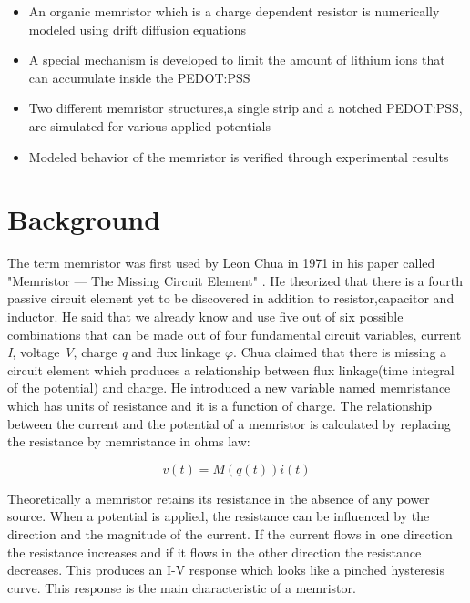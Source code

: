 \begin{doublespace}
\begin{itemize}
  \item An organic memristor which is a charge dependent resistor is numerically modeled using drift diffusion equations  
  \item A special mechanism is developed to limit the amount of lithium ions that can accumulate inside the PEDOT:PSS
  \item Two different memristor structures,a single strip and a notched PEDOT:PSS, are simulated for various applied potentials
  \item Modeled behavior of the memristor is verified through experimental results 
\end{itemize}

\section{Background}
The term memristor was first used by Leon Chua in 1971 in his paper called  "Memristor — The Missing Circuit Element" \cite{chua}. He theorized that there is a fourth passive circuit element yet to be discovered in addition to resistor,capacitor and inductor. He said that we already know and use five out of six possible combinations that can be made out of four fundamental circuit variables, current \textit{I}, voltage \textit{V}, charge \textit{q} and flux linkage \textit{$\varphi$}. Chua claimed that there is missing a circuit element which produces a relationship between flux linkage(time integral of the potential) and charge. He introduced a new variable named memristance which has units of resistance and it is a function of charge. The relationship between the current and the potential of a memristor is calculated by replacing the resistance by memristance in ohms law:


\begin{equation}
v(t)=M(q(t))i(t)
\end{equation}

Theoretically a memristor retains its resistance in the absence of any power source. When a potential is applied, the resistance can be influenced by the direction and the magnitude of the current. If the current flows in one direction the resistance increases and if it flows in the other direction the resistance decreases. This produces an I-V response which looks like a pinched hysteresis curve. This response is the main characteristic of a memristor. 


\end{doublespace}
